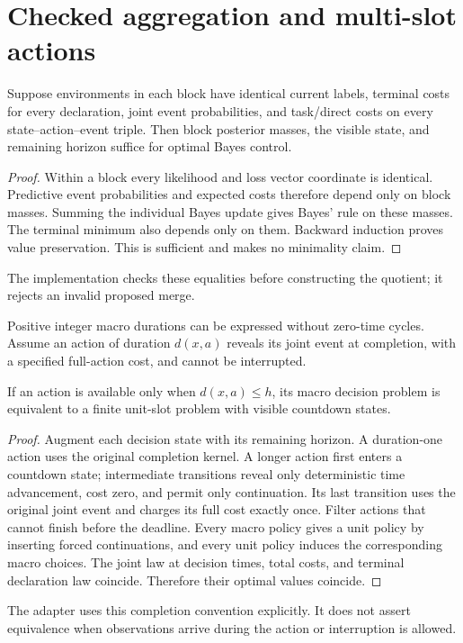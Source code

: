 \section{Checked aggregation and multi-slot actions}
\label{app:adapters}
\begin{proposition}
Suppose environments in each block have identical current labels, terminal
costs for every declaration, joint event probabilities, and task/direct
costs on every state--action--event triple. Then block posterior masses,
the visible state, and remaining horizon suffice for optimal Bayes control.
\end{proposition}
\begin{proof}
Within a block every likelihood and loss vector coordinate is identical.
Predictive event probabilities and expected costs therefore depend only on
block masses. Summing the individual Bayes update gives Bayes' rule on these
masses. The terminal minimum also depends only on them. Backward induction
proves value preservation. This is sufficient and makes no minimality claim.
\end{proof}
The implementation checks these equalities before constructing the quotient;
it rejects an invalid proposed merge.

Positive integer macro durations can be expressed without zero-time cycles.
Assume an action of duration $d(x,a)$ reveals its joint event at completion,
with a specified full-action cost, and cannot be interrupted.
\begin{proposition}
If an action is available only when $d(x,a)\le h$, its macro decision problem
is equivalent to a finite unit-slot problem with visible countdown states.
\end{proposition}
\begin{proof}
Augment each decision state with its remaining horizon. A duration-one action
uses the original completion kernel. A longer action first enters a countdown
state; intermediate transitions reveal only deterministic time advancement,
cost zero, and permit only continuation. Its last transition uses the original
joint event and charges its full cost exactly once. Filter actions that cannot
finish before the deadline. Every macro policy gives a unit policy by inserting
forced continuations, and every unit policy induces the corresponding macro
choices. The joint law at decision times, total costs, and terminal declaration
law coincide. Therefore their optimal values coincide.
\end{proof}
The adapter uses this completion convention explicitly. It does not assert
equivalence when observations arrive during the action or interruption is allowed.

